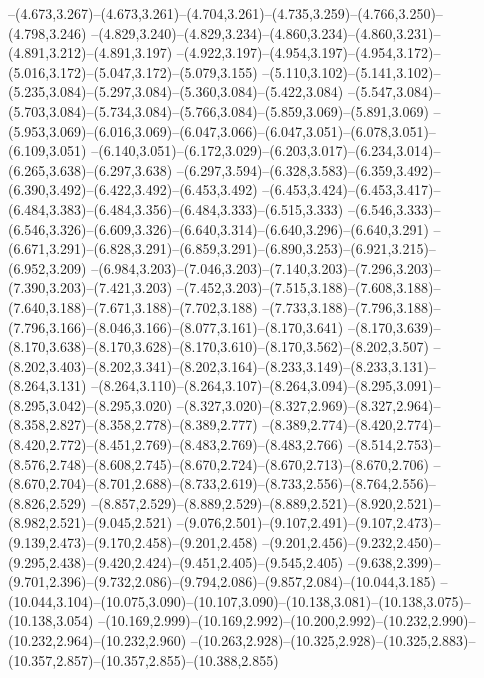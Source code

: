   --(4.673,3.267)--(4.673,3.261)--(4.704,3.261)--(4.735,3.259)--(4.766,3.250)--(4.798,3.246)%
  --(4.829,3.240)--(4.829,3.234)--(4.860,3.234)--(4.860,3.231)--(4.891,3.212)--(4.891,3.197)%
  --(4.922,3.197)--(4.954,3.197)--(4.954,3.172)--(5.016,3.172)--(5.047,3.172)--(5.079,3.155)%
  --(5.110,3.102)--(5.141,3.102)--(5.235,3.084)--(5.297,3.084)--(5.360,3.084)--(5.422,3.084)%
  --(5.547,3.084)--(5.703,3.084)--(5.734,3.084)--(5.766,3.084)--(5.859,3.069)--(5.891,3.069)%
  --(5.953,3.069)--(6.016,3.069)--(6.047,3.066)--(6.047,3.051)--(6.078,3.051)--(6.109,3.051)%
  --(6.140,3.051)--(6.172,3.029)--(6.203,3.017)--(6.234,3.014)--(6.265,3.638)--(6.297,3.638)%
  --(6.297,3.594)--(6.328,3.583)--(6.359,3.492)--(6.390,3.492)--(6.422,3.492)--(6.453,3.492)%
  --(6.453,3.424)--(6.453,3.417)--(6.484,3.383)--(6.484,3.356)--(6.484,3.333)--(6.515,3.333)%
  --(6.546,3.333)--(6.546,3.326)--(6.609,3.326)--(6.640,3.314)--(6.640,3.296)--(6.640,3.291)%
  --(6.671,3.291)--(6.828,3.291)--(6.859,3.291)--(6.890,3.253)--(6.921,3.215)--(6.952,3.209)%
  --(6.984,3.203)--(7.046,3.203)--(7.140,3.203)--(7.296,3.203)--(7.390,3.203)--(7.421,3.203)%
  --(7.452,3.203)--(7.515,3.188)--(7.608,3.188)--(7.640,3.188)--(7.671,3.188)--(7.702,3.188)%
  --(7.733,3.188)--(7.796,3.188)--(7.796,3.166)--(8.046,3.166)--(8.077,3.161)--(8.170,3.641)%
  --(8.170,3.639)--(8.170,3.638)--(8.170,3.628)--(8.170,3.610)--(8.170,3.562)--(8.202,3.507)%
  --(8.202,3.403)--(8.202,3.341)--(8.202,3.164)--(8.233,3.149)--(8.233,3.131)--(8.264,3.131)%
  --(8.264,3.110)--(8.264,3.107)--(8.264,3.094)--(8.295,3.091)--(8.295,3.042)--(8.295,3.020)%
  --(8.327,3.020)--(8.327,2.969)--(8.327,2.964)--(8.358,2.827)--(8.358,2.778)--(8.389,2.777)%
  --(8.389,2.774)--(8.420,2.774)--(8.420,2.772)--(8.451,2.769)--(8.483,2.769)--(8.483,2.766)%
  --(8.514,2.753)--(8.576,2.748)--(8.608,2.745)--(8.670,2.724)--(8.670,2.713)--(8.670,2.706)%
  --(8.670,2.704)--(8.701,2.688)--(8.733,2.619)--(8.733,2.556)--(8.764,2.556)--(8.826,2.529)%
  --(8.857,2.529)--(8.889,2.529)--(8.889,2.521)--(8.920,2.521)--(8.982,2.521)--(9.045,2.521)%
  --(9.076,2.501)--(9.107,2.491)--(9.107,2.473)--(9.139,2.473)--(9.170,2.458)--(9.201,2.458)%
  --(9.201,2.456)--(9.232,2.450)--(9.295,2.438)--(9.420,2.424)--(9.451,2.405)--(9.545,2.405)%
  --(9.638,2.399)--(9.701,2.396)--(9.732,2.086)--(9.794,2.086)--(9.857,2.084)--(10.044,3.185)%
  --(10.044,3.104)--(10.075,3.090)--(10.107,3.090)--(10.138,3.081)--(10.138,3.075)--(10.138,3.054)%
  --(10.169,2.999)--(10.169,2.992)--(10.200,2.992)--(10.232,2.990)--(10.232,2.964)--(10.232,2.960)%
  --(10.263,2.928)--(10.325,2.928)--(10.325,2.883)--(10.357,2.857)--(10.357,2.855)--(10.388,2.855)%

